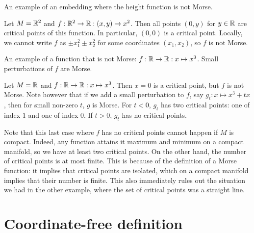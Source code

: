 \begin{marginfigure}
    \centering
    \caption{An example of an embedding where the height function is not Morse.}
    \label{fig:non-example-of-morse-function}
\end{marginfigure}
\begin{noneg}
    Let $M = \mathbb{R}^2$ and $f: \mathbb{R}^2 \to  \mathbb{R}: (x, y) \mapsto  x^2$.
    Then all points $(0, y)$ for  $y \in \mathbb{R}$ are critical points of this function.
    In particular, $(0, 0)$ is a critical point. Locally, we cannot write $f$ as  $ \pm x_1^2 \pm x_2^2$ for some coordinates $(x_1, x_2)$, so $f$ is not Morse.
\end{noneg}
\begin{marginfigure}
    \centering
    \caption{An example of a function that is not Morse: $f: \mathbb{R} \to  \mathbb{R}: x \mapsto  x^3$.
        Small perturbations of $f$ are Morse.
    }
    \label{fig:non-examples-of-morse-functions}
\end{marginfigure}
\begin{noneg}
    Let $M = \mathbb{R}$ and $f : \mathbb{R} \to  \mathbb{R}: x \mapsto x^3$.
    Then $x = 0$ is a critical point, but $f$ is not Morse.
    Note however that if we add a small perturbation to $f$, say $g_t: x\mapsto x^3+ tx$, then for small non-zero $t$, $g$ is Morse. For $t < 0$, $g_t$  has two critical points: one of index $1$ and one of index $0$.
    If $t > 0$,  $g_t$ has no critical points.
\end{noneg}

Note that this last case where $f$ has no critical points cannot happen if $M$ is compact.
Indeed, any function attains it maximum and minimum on a compact manifold, so we have at least two critical points.
On the other hand, the number of critical points is at most finite.
This is because of the definition of a Morse function: it implies that critical points are isolated, which on a compact manifold implies that their number is finite.
This also immediately rules out the situation we had in the other example, where the set of critical points was a straight line.

\section{Coordinate-free definition}

